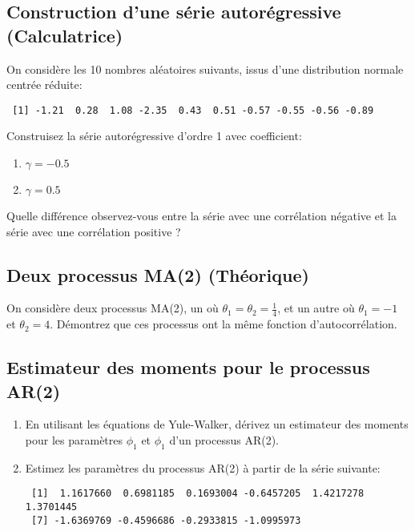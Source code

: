 \documentclass[11pt,english,francais]{article}
\begin{document}
\subsection{Construction d'une série autorégressive (Calculatrice)}
\label{sec:constr-dune-serie}

On considère les 10 nombres aléatoires suivants, issus d'une distribution normale centrée réduite:

\begin{verbatim}
 [1] -1.21  0.28  1.08 -2.35  0.43  0.51 -0.57 -0.55 -0.56 -0.89
\end{verbatim}

Construisez la série autorégressive d'ordre 1 avec coefficient: 
\begin{enumerate}
\item $\gamma = -0.5$
\item $\gamma = 0.5$
\end{enumerate}

Quelle différence observez-vous entre la série avec une corrélation négative et la série avec une corrélation positive ?

\subsection{Deux processus MA(2) (Théorique)}

On considère deux processus MA(2), un où $\theta_1 = \theta_2 = \frac{1}{4}$, et un autre où $\theta_1=-1$ et $\theta_2 = 4$. Démontrez que ces processus ont la même fonction d'autocorrélation.

\subsection{Estimateur des moments pour le processus AR(2)}

\begin{enumerate}
\item En utilisant les équations de Yule-Walker, dérivez un estimateur des moments pour les paramètres $\phi_1$ et $\phi_1$ d'un processus AR(2). \\

\item Estimez les paramètres du processus AR(2) à partir de la série suivante:
\begin{verbatim}
 [1]  1.1617660  0.6981185  0.1693004 -0.6457205  1.4217278  1.3701445
 [7] -1.6369769 -0.4596686 -0.2933815 -1.0995973
\end{verbatim}
\end{enumerate}


\clearpage


\end{document}
